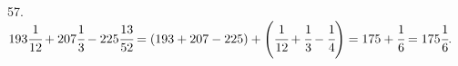 57. $193\cfrac{1}{12}+207\cfrac{1}{3}-225\cfrac{13}{52}=(193+207-225)+\left(\cfrac{1}{12}+\cfrac{1}{3}-\cfrac{1}{4}\right)=175+\cfrac{1}{6}=175\cfrac{1}{6}.$
\newpage
